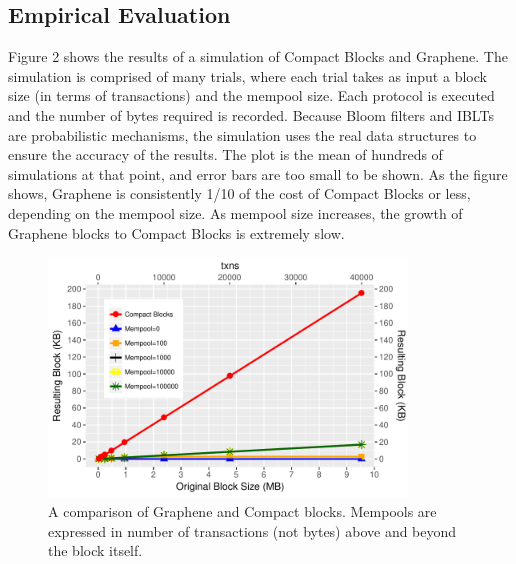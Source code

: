 

\subsection{Empirical Evaluation}

Figure 2 shows the results of a simulation of
Compact Blocks and Graphene. The simulation is comprised
of many trials, where each trial takes as input a block size (in terms
of transactions) and the mempool size. Each protocol is executed and the
number of bytes required is recorded. Because Bloom filters
and IBLTs are probabilistic mechanisms, the simulation uses
the real data structures to ensure the accuracy of the results.
The plot is the mean of hundreds of simulations
at that point, and error bars are too small to be shown.
As the figure shows, Graphene is consistently 1/10 of the
cost of Compact Blocks or less, depending on the mempool
size. As mempool size increases, the growth of Graphene blocks to Compact Blocks is extremely slow.

\begin{figure}\begin{center}
	\includegraphics[width=0.85\textwidth]{graphs/graphene}
	\caption{A comparison of Graphene and Compact blocks.
Mempools are expressed in number of transactions (not
bytes) above and beyond the block itself.
	\label{fig:graphene}}
\end{center}\end{figure}

